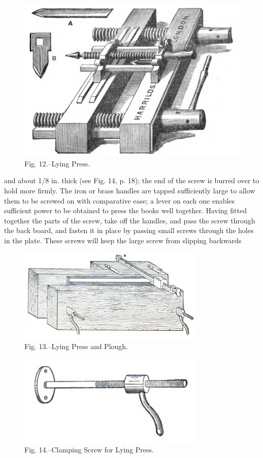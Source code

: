 \documentclass[twoside]{book}
\begin{document}
	\begin{figure}[h]
		\centering
		\includegraphics[width=\textwidth]{Figures/_012.png}
		\caption*{Fig. 12.--Lying Press.}
	\end{figure}
and about 1/8 in. thick (see Fig. 14, p. 18); the end of
the screw is burred over to hold more firmly. The
iron or brass handles are tapped sufficiently large to
allow them to be screwed on with comparative
ease; a lever on each one enables sufficient power
to be obtained to press the books well together.
Having fitted together the parts of the screw, take
off the handles, and pass the screw through the
back board, and fasten it in place by passing small
screws through the holes in the plate. These screws
will keep the large screw from slipping backwards
\pagebreak
	\vspace*{\fill}
	\begin{figure}[h]
		\centering
		\includegraphics[width=0.8\textwidth]{Figures/_013.png}
		\caption*{Fig. 13.--Lying Press and Plough.}
	\end{figure}
	\vspace*{\fill}
	\begin{figure}[h]
		\centering
		\includegraphics[width=0.8\textwidth]{Figures/_014.png}
		\caption*{Fig. 14.--Clamping Screw for Lying Press.}
	\end{figure}
\end{document}
